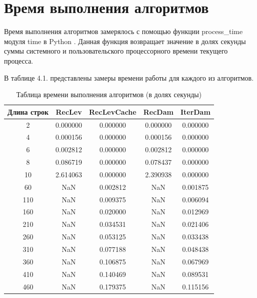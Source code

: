 \documentclass[12pt]{report}
\begin{document}
	\section{Время выполнения алгоритмов}
	Время выполнения алгоритмов замерялось с помощью функции process\_time модуля time в Python  \cite{process}. Данная функция возвращает значение в долях секунды суммы системного и пользовательского процессорного времени текущего процесса. \newline
	
	В таблице 4.1. представлены замеры времени работы для каждого из алгоритмов.
	
	\begin{table} [h!]
		\caption{Таблица времени выполнения алгоритмов (в долях секунды)}
		\begin{center}
			\begin{tabular}{|c c c c c|} 
				\hline
				Длина строк & RecLev & RecLevCache & RecDam & IterDam \\  
				\hline
				2 & 0.000000 & 0.000000 & 0.000000 & 0.000000\\
				\hline
				4 & 0.000156 & 0.000000 & 0.000156 & 0.000000\\
				\hline
				6 & 0.002812 & 0.000000 & 0.002812 & 0.000000 \\
				\hline
				8 & 0.086719 & 0.000000 & 0.078437 & 0.000000 \\
				\hline
				10 & 2.614063 & 0.000000 & 2.390938 & 0.000000\\
				\hline
				60 & NaN & 0.002812 & NaN & 0.001875\\
				\hline
				110 & NaN & 0.009375 & NaN & 0.006094\\
				\hline
				160 & NaN & 0.020000 & NaN & 0.012969\\
				\hline
				210 & NaN & 0.034531 & NaN & 0.021406\\
				\hline
				260 & NaN & 0.053125 & NaN & 0.033438\\
				\hline
				310 & NaN & 0.077188 & NaN & 0.048438\\
				\hline
				360 & NaN & 0.106875 & NaN & 0.067969\\
				\hline
				410 & NaN & 0.140469 & NaN & 0.089531\\
				\hline
				460 & NaN & 0.179375 & NaN & 0.115156\\
				\hline
			\end{tabular}
		\end{center}
	\end{table}
	
\end{document}
